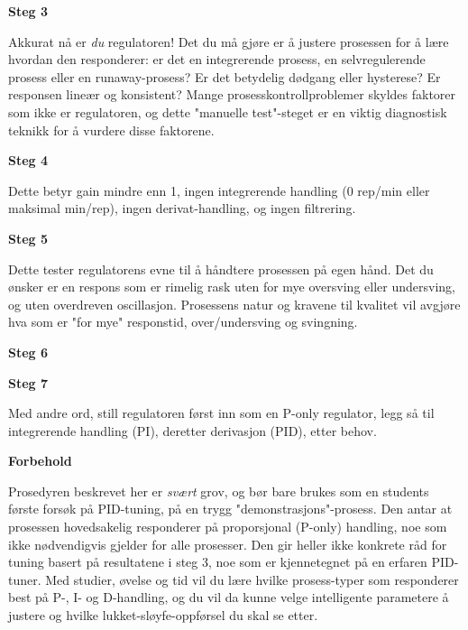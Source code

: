 \vskip 10pt

\noindent
{\bf Steg 3}

  Akkurat nå er {\it du} regulatoren!  Det du må gjøre er å justere prosessen for å lære hvordan den responderer: er det en integrerende prosess, en selvregulerende prosess eller en runaway-prosess?  Er det betydelig dødgang eller hysterese?  Er responsen lineær og konsistent?  Mange prosesskontrollproblemer skyldes faktorer som ikke er regulatoren, og dette "manuelle test"-steget er en viktig diagnostisk teknikk for å vurdere disse faktorene.

\vskip 10pt

\noindent
{\bf Steg 4}

  Dette betyr gain mindre enn 1, ingen integrerende handling (0 rep/min eller maksimal min/rep), ingen derivat-handling, og ingen filtrering.

\vskip 10pt

\noindent
{\bf Steg 5}

  Dette tester regulatorens evne til å håndtere prosessen på egen hånd.  Det du ønsker er en respons som er rimelig rask uten for mye oversving eller undersving, og uten overdreven oscillasjon.  Prosessens natur og kravene til kvalitet vil avgjøre hva som er "for mye" responstid, over/undersving og svingning.

\vskip 10pt

\noindent
{\bf Steg 6}


\vskip 10pt

\noindent
{\bf Steg 7}

  Med andre ord, still regulatoren først inn som en P-only regulator, legg så til integrerende handling (PI), deretter derivasjon (PID), etter behov.

\filbreak

\centerline{\bf Forbehold}

\vskip 10pt

Prosedyren beskrevet her er {\it svært} grov, og bør bare brukes som en students første forsøk på PID-tuning, på en trygg "demonstrasjons"-prosess.  Den antar at prosessen hovedsakelig responderer på proporsjonal (P-only) handling, noe som ikke nødvendigvis gjelder for alle prosesser.  Den gir heller ikke konkrete råd for tuning basert på resultatene i steg 3, noe som er kjennetegnet på en erfaren PID-tuner.  Med studier, øvelse og tid vil du lære hvilke prosess-typer som responderer best på P-, I- og D-handling, og du vil da kunne velge intelligente parametere å justere og hvilke lukket-sløyfe-oppførsel du skal se etter.

